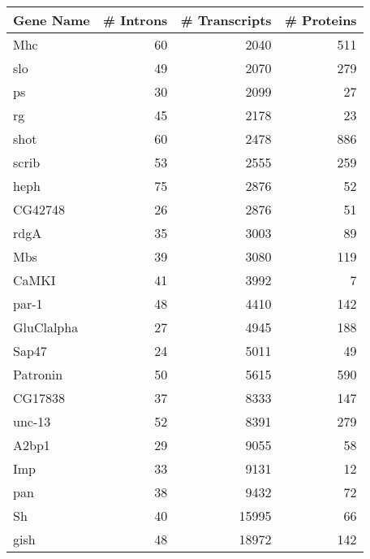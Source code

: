 \renewcommand{\arraystretch}{0.5}
\small
\begin{tabular}[c]{l|r|r|r}
	\hline
	\textbf{Gene Name} & \textbf{\# Introns} & \textbf{\# Transcripts} & \textbf{\# Proteins}\\
	\hline
	Mhc & 60 &  2040 & 511\\
	\hline
	slo & 49 &  2070 & 279\\
	\hline
	ps & 30 &  2099 &  27\\
	\hline
	rg & 45 &  2178 &  23\\
	\hline
	shot & 60 &  2478 & 886\\
	\hline
	scrib & 53 &  2555 & 259\\
	\hline
	heph & 75 &  2876 &  52\\
	\hline
	CG42748 & 26 &  2876 &  51\\
	\hline
	rdgA & 35 &  3003 &  89\\
	\hline
	Mbs & 39 &  3080 & 119\\
	\hline
	CaMKI & 41 &  3992 &   7\\
	\hline
	par-1 & 48 &  4410 & 142\\
	\hline
	GluClalpha & 27 &  4945 & 188\\
	\hline
	Sap47 & 24 &  5011 &  49\\
	\hline
	Patronin & 50 &  5615 & 590\\
	\hline
	CG17838 & 37 &  8333 & 147\\
	\hline
	unc-13 & 52 &  8391 & 279\\
	\hline
	A2bp1 & 29 &  9055 &  58\\
	\hline
	Imp & 33 &  9131 &  12\\
	\hline
	pan & 38 &  9432 &  72\\
	\hline
	Sh & 40 & 15995 &  66\\
	\hline
	gish & 48 & 18972 & 142\\
	\hline
  \end{tabular}